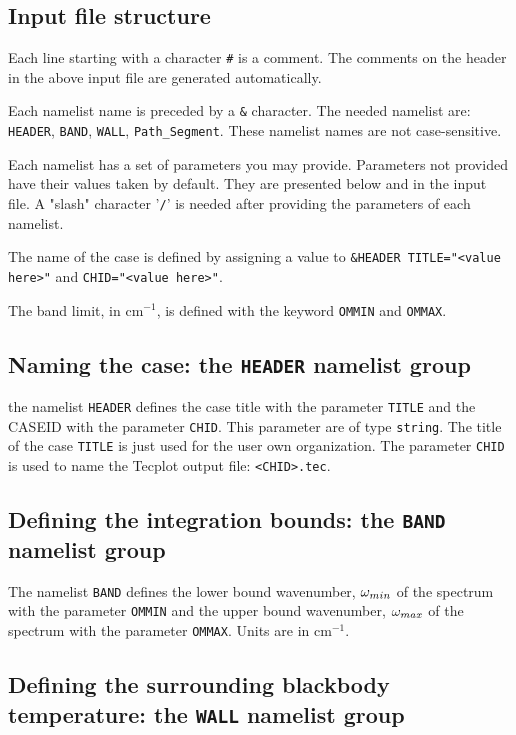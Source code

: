 \subsection{Input file structure}

Each line starting with a character \verb=#= is a comment. The comments on the header in the above input file are generated automatically.

Each namelist name is preceded by a \verb=&= character. The needed namelist are:
\verb=HEADER=, \verb=BAND=, \verb=WALL=, \verb=Path_Segment=. These namelist names are not case-sensitive.

Each namelist has a set of parameters you may provide. Parameters not provided have their values taken by default. They are presented below and in the input file.
A "slash" character '\verb=/=' is needed after providing the parameters of each namelist.

The name of the case is defined by assigning a value to \verb'&HEADER TITLE="<value here>"' and \verb'CHID="<value here>"'.

The band limit, in cm$^{-1}$, is defined with the keyword \verb=OMMIN= and \verb=OMMAX=.

\subsection{Naming the case: the \texorpdfstring{{\tt HEADER}}{HEADER} namelist group}

the namelist \verb=HEADER= defines the case title with the parameter \verb=TITLE= and the CASEID with the parameter \verb=CHID=.
This parameter are of type \verb=string=. The title of the case \verb=TITLE= is just used for the user own organization. The parameter \verb=CHID= is used to name the Tecplot output file: \verb=<CHID>.tec=.

\subsection{Defining the integration bounds: the \texorpdfstring{{\tt BAND}}{BAND} namelist group}

The namelist \verb=BAND= defines the lower bound wavenumber, $\omega_{min}$ of the spectrum with the parameter \verb=OMMIN= and the upper bound wavenumber, $\omega_{max}$ of the spectrum with the parameter \verb=OMMAX=. Units are in cm$^{-1}$.

\subsection{Defining the surrounding blackbody temperature: the \texorpdfstring{{\tt WALL}}{WALL} namelist group}

